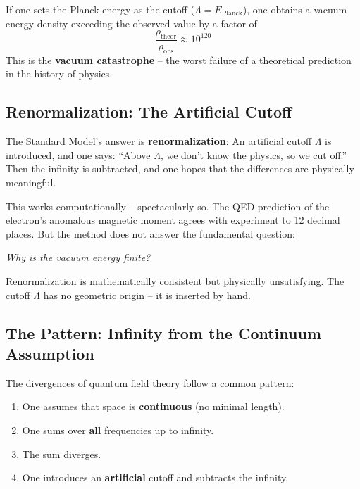 	If one sets the Planck energy as the cutoff ($\Lambda = E_{\text{Planck}}$), one obtains a vacuum energy density exceeding the observed value by a factor of
	\begin{equation}
		\frac{\rho_{\text{theor}}}{\rho_{\text{obs}}} \approx 10^{120}
	\end{equation}
	This is the \textbf{vacuum catastrophe} -- the worst failure of a theoretical prediction in the history of physics.
	
	\subsection{Renormalization: The Artificial Cutoff}
	
	The Standard Model's answer is \textbf{renormalization}: An artificial cutoff $\Lambda$ is introduced, and one says: ``Above $\Lambda$, we don't know the physics, so we cut off.'' Then the infinity is subtracted, and one hopes that the differences are physically meaningful.
	
	This works computationally -- spectacularly so. The QED prediction of the electron's anomalous magnetic moment agrees with experiment to 12 decimal places. But the method does not answer the fundamental question:
	
	\begin{center}
		\textit{Why is the vacuum energy finite?}
	\end{center}
	
	Renormalization is mathematically consistent but physically unsatisfying. The cutoff $\Lambda$ has no geometric origin -- it is inserted by hand.
	
	\subsection{The Pattern: Infinity from the Continuum Assumption}
	
	The divergences of quantum field theory follow a common pattern:
	
	\begin{enumerate}
		\item One assumes that space is \textbf{continuous} (no minimal length).
		\item One sums over \textbf{all} frequencies up to infinity.
		\item The sum diverges.
		\item One introduces an \textbf{artificial} cutoff and subtracts the infinity.
	\end{enumerate}
	
